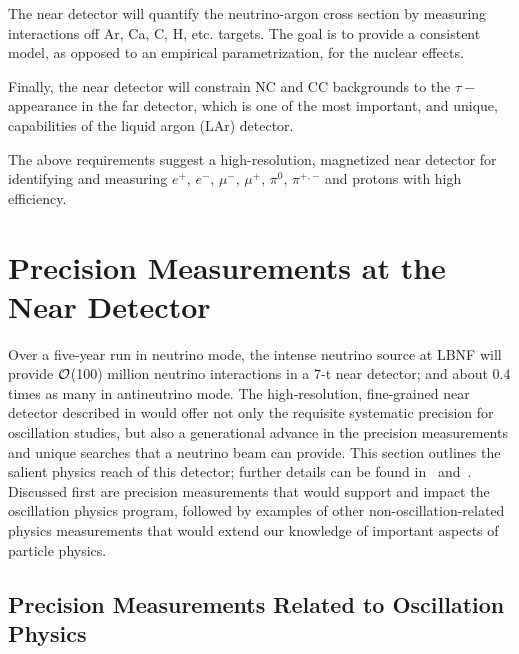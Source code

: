 
The near detector will quantify the neutrino-argon cross section 
by measuring interactions off Ar, Ca, C, H, etc. targets. The goal is to provide 
a consistent model, as opposed to an empirical parametrization, for the nuclear effects. 


Finally, the near detector will constrain NC and CC backgrounds to the $\tau-$ appearance in the far detector, 
which is one of the most important, and unique, capabilities of the liquid argon (LAr) detector. 

The above requirements suggest a high-resolution, magnetized near detector for identifying and 
measuring $e^+$, $e^-$, $\mu^-$, $\mu^+$, $\pi^0$, $\pi^{+,-}$ and protons  with high efficiency. 



\section{Precision Measurements at the Near Detector} 
\label{sec-nd-sbp} 

Over a five-year run in neutrino mode,  %
the intense neutrino source at LBNF will provide 
${\cal {O}}$(100) million neutrino interactions in a 7-t near detector; 
and about $0.4$ times as many in antineutrino mode. %
The high-resolution, fine-grained near detector described in \voldune would offer not only the requisite systematic 
precision for  oscillation studies, but also a generational advance in the precision measurements and unique 
searches that a neutrino beam can provide.  This section outlines the salient physics reach of this detector; further details can be 
found in~\cite{DPR} and~\cite{Adams:2013qkq}. Discussed first are precision measurements that would support 
and impact the oscillation physics program, followed by examples of other non-oscillation-related 
physics measurements that would extend our knowledge of important aspects of particle physics. 


\subsection{Precision Measurements Related to Oscillation Physics}

